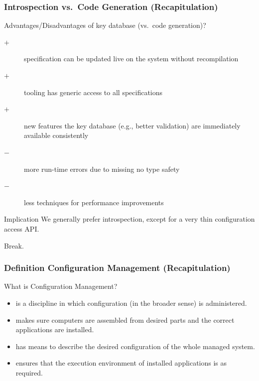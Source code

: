 \begin{frame}
	\frametitle{Introspection vs.\ Code Generation (Recapitulation)}

	\begin{task}
	Advantages/Disadvantages of key database (vs.\ code generation)?
	\end{task}

	\pause

	\begin{description}
	\item[$+$] specification can be updated live on the system without recompilation
	\item[$+$] tooling has generic access to all specifications
 	\item[$+$] new features the key database (e.g., better validation) are immediately available consistently
	\item[$-$] more run-time errors due to missing no type safety
	\item[$-$] less techniques for performance improvements
	\end{description}

	\begin{alertblock}{Implication}
	We generally prefer introspection, except for a very thin configuration access API.
	\end{alertblock}
\end{frame}

\begin{assignment}
	\begin{task}
	Break.
	\end{task}
\end{assignment}


\begin{frame}
	\frametitle{Definition Configuration Management (Recapitulation)}

	\begin{task}
	What is Configuration Management?
	\end{task}

	\pause

	\begin{itemize}
	\item is a discipline in which configuration (in the broader sense) is administered.
	\item makes sure computers are assembled from desired parts and the correct applications are installed.
	\item has means to describe the desired configuration of the whole managed system.
	\item ensures that the execution environment of installed applications is as required.
	\end{itemize}
\end{frame}


